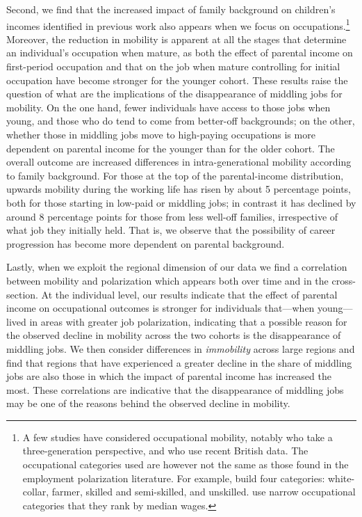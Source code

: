 Second, we find that the increased impact of family background on children's incomes identified in previous work also appears when we focus on occupations.\footnote{A few studies have considered occupational mobility, notably \citet{Long2013Intergenerational} who take a three-generation perspective, and \citet{Bell2018Land} who use recent British data. The occupational categories used are however not the same as those found in the employment polarization literature. For example,  \citet{Long2013Intergenerational} build four categories: white-collar, farmer, skilled and semi-skilled, and unskilled. \citet{Bell2018Land} use narrow occupational categories that they rank by median wages.} Moreover, the reduction in mobility is apparent at all the stages that determine an individual’s occupation when mature, as both the effect of parental income on first-period occupation and that on the job when mature controlling for initial occupation have become stronger for the younger cohort. These results raise the question of what are the implications of the disappearance of middling jobs for mobility. On the one hand, fewer individuals have access to those jobs when young, and those who do tend to come from better-off backgrounds; on the other, whether those in middling jobs move to high-paying occupations is more dependent on parental income for the younger than for the older cohort. The overall outcome are increased differences in intra-generational mobility according to family background. For those at the top of the parental-income distribution, upwards mobility during the working life has risen by about 5 percentage points, both for those starting in low-paid or middling jobs; in contrast it has declined by around 8 percentage points for those from less well-off families, irrespective of what job they initially held. That is, we observe that the possibility of career progression has become more dependent on parental background.

Lastly, when we exploit the regional dimension of our data we find a correlation between mobility and polarization which appears both over time and in the cross-section. At the individual level, our results indicate that the effect of parental income on occupational outcomes is stronger for individuals that---when young--- lived in areas with greater job polarization, indicating that a possible reason for the observed decline in mobility across the two cohorts is the disappearance of middling jobs.  
We then consider differences in \emph{immobility} across large regions and find that regions that have experienced a greater decline in the share of middling jobs are also those in which the impact of parental income has increased the most. These correlations are indicative that the disappearance of middling jobs may be one of the reasons behind the observed decline in mobility.

